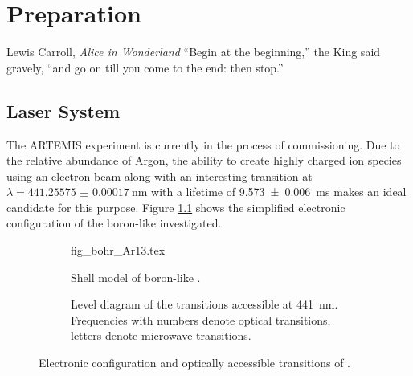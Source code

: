 \chapter{Preparation}%
\label{sec:preparation}
\begin{chapquote}{Lewis Carroll, \textit{Alice in Wonderland}}
``Begin at the beginning,'' the King said gravely, ``and go on till you come to the end: then stop.''
\end{chapquote}

\section{Laser System}
The ARTEMIS experiment is currently in the process of commissioning. Due to the relative abundance of Argon, the ability to create highly charged ion species using an electron beam along with an interesting transition at $\lambda = \qty{441.25575(17)}{\nm}$ \cite{ar13+_wavelength} with a lifetime of \qty{9.573(6)}{\ms} \cite{ar13+_lifetime} makes  an ideal candidate for this purpose. Figure \ref{fig:bohr_ar13} shows the simplified electronic configuration of the boron-like  investigated.
\begin{figure}[ht]
    \centering
    \begin{subfigure}{0.28\linewidth}
        \centering
        {fig_bohr_Ar13.tex}
        \caption{Shell model of boron-like .}
        \label{fig:bohr_ar13}
    \end{subfigure}
    \begin{subfigure}{0.6\linewidth}
        \centering
        \caption{Level diagram of the  transitions accessible at \qty{441}{\nm}. Frequencies with numbers denote optical transitions, letters denote microwave transitions.}
        \label{fig:level_transitions}
    \end{subfigure}
    \caption{Electronic configuration and optically accessible transitions of .}
    \label{fig:ar13}
\end{figure}

